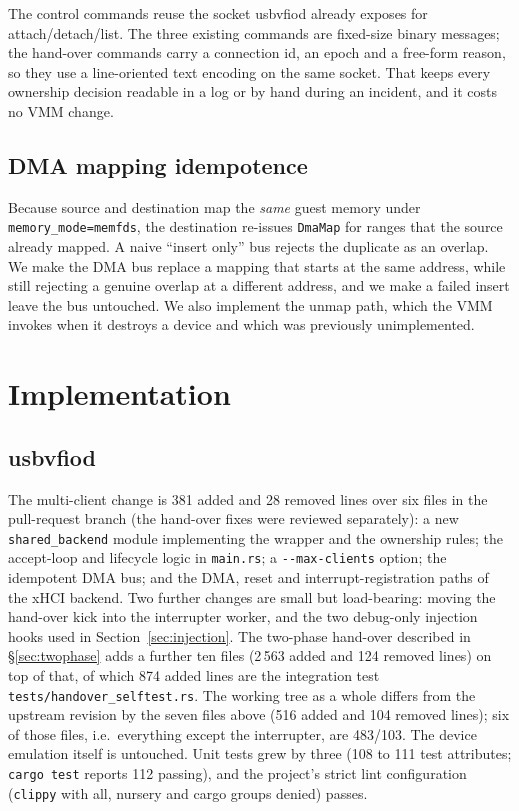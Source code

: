 \documentclass[10pt,conference]{IEEEtran}
\newcommand{\code}[1]{\texttt{#1}}
\begin{document}
The control commands reuse the socket usbvfiod already exposes for
attach/detach/list. The three existing commands are fixed-size binary messages;
the hand-over commands carry a connection id, an epoch and a free-form reason,
so they use a line-oriented text encoding on the same socket. That keeps every
ownership decision readable in a log or by hand during an incident, and it costs
no VMM change.

\subsection{DMA mapping idempotence}
\label{sec:dma}
Because source and destination map the \emph{same} guest memory under
\code{memory\_mode=memfds}, the destination re-issues \code{DmaMap} for ranges
that the source already mapped. A naive ``insert only'' bus rejects the
duplicate as an overlap. We make the DMA bus replace a mapping that starts at
the same address, while still rejecting a genuine overlap at a different
address, and we make a failed insert leave the bus untouched. We also implement
the unmap path, which the VMM invokes when it destroys a device and which was
previously unimplemented.

\section{Implementation}
\label{sec:implementation}

\subsection{usbvfiod}
The multi-client change is 381 added and 28 removed lines over six files in the
pull-request branch (the hand-over fixes were reviewed separately): a new
\code{shared\_backend} module
implementing the wrapper and the ownership rules; the accept-loop and lifecycle
logic in \code{main.rs}; a \code{-{}-max-clients} option; the idempotent DMA
bus; and the DMA, reset and interrupt-registration paths of the xHCI backend.
Two further changes are small but load-bearing: moving the hand-over kick into
the interrupter worker, and the two debug-only injection hooks used in
Section~\ref{sec:injection}. The two-phase hand-over described in
\S\ref{sec:twophase} adds a further ten files (2\,563 added and 124 removed
lines) on top of that, of which 874 added lines are the integration test
\code{tests/handover\_selftest.rs}. The working tree as a whole differs from
the upstream revision by the seven files above (516 added and 104 removed
lines); six of those files, i.e.\ everything except the interrupter, are 483/103. The
device emulation itself is untouched. Unit tests grew by three (108 to 111 test
attributes; \code{cargo test} reports 112 passing),
and the project's strict lint configuration (\code{clippy} with all, nursery and
cargo groups denied) passes.
\end{document}
